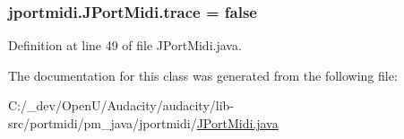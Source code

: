 \subsubsection[{\texorpdfstring{trace}{trace}}]{ jportmidi.\+J\+Port\+Midi.\+trace = {\bf false}\hspace{0.3cm}{\ttfamily [protected]}}\hypertarget{classjportmidi_1_1_j_port_midi_acc48f9ed73d3d075ffc7f898db8b8b5a}{}\label{classjportmidi_1_1_j_port_midi_acc48f9ed73d3d075ffc7f898db8b8b5a}


Definition at line 49 of file J\+Port\+Midi.\+java.



The documentation for this class was generated from the following file\+:\begin{DoxyCompactItemize}
\item 
C\+:/\+\_\+dev/\+Open\+U/\+Audacity/audacity/lib-\/src/portmidi/pm\+\_\+java/jportmidi/\hyperlink{_j_port_midi_8java}{J\+Port\+Midi.\+java}\end{DoxyCompactItemize}
